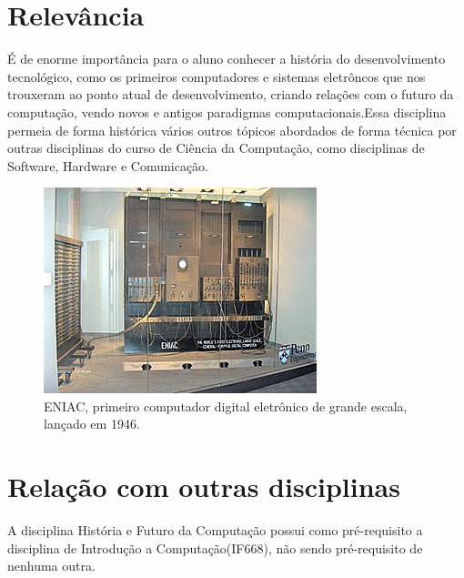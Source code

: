 \documentclass[a4paper, 12pt]{article}
\begin{document}
\section{Relevância}
É de enorme importância para o aluno conhecer a história do desenvolvimento tecnológico, como os primeiros computadores e sistemas eletrôncos que nos trouxeram ao ponto atual de desenvolvimento, criando relações com o futuro da computação, vendo novos e antigos paradigmas computacionais.\newpage Essa disciplina permeia de forma histórica vários outros tópicos abordados de forma técnica por outras disciplinas do curso de Ciência da Computação, como disciplinas de Software, Hardware e Comunicação.
\begin{figure}[h!]
\centering
\includegraphics[scale=0.8]{eniac.jpg}
\caption{ENIAC, primeiro computador digital eletrônico de grande escala, lançado em 1946.\cite{eniac}}
\label{fig:eniac.jpg}
\end{figure}
\section{Relação com outras disciplinas}
A disciplina História e Futuro da Computação possui como pré-requisito a disciplina de Introdução a Computação(IF668), não sendo pré-requisito de nenhuma outra.




\end{document}
